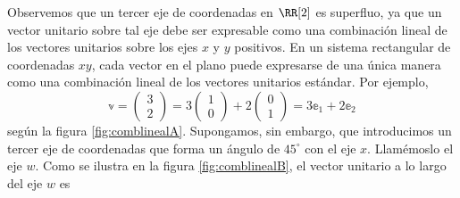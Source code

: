 Observemos que un tercer eje de coordenadas en $\RR[2]$ es superfluo, ya que un vector unitario sobre tal eje debe ser expresable como una combinación lineal de los vectores unitarios sobre los ejes $x$ y $y$ positivos. En un sistema rectangular de coordenadas $xy$, cada vector en el plano puede expresarse de una única manera como una combinación lineal de los vectores unitarios estándar. Por ejemplo,
\begin{equation}
    \mathbb{v} = \begin{pmatrix}
        3 \\
        2
    \end{pmatrix} = 3 \begin{pmatrix}
        1 \\
        0
    \end{pmatrix} + 2 \begin{pmatrix}
        0 \\
        1
    \end{pmatrix} = 3\mathbb{e}_1 + 2\mathbb{e}_2 \label{LABHQIOPQPQJDJD}
\end{equation}
según la figura \ref{fig:comblinealA}. Supongamos, sin embargo, que introducimos un tercer eje de coordenadas que forma un ángulo de $45^{\circ}$ con el eje $x$. Llamémoslo el eje $w$. Como se ilustra en la figura \ref{fig:comblinealB}, el vector unitario a lo largo del eje $w$ es
\begin{matrizn}
\end{matrizn}

